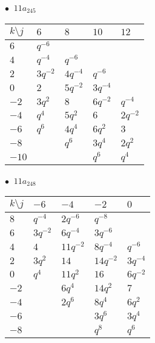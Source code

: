 \begin{minipage}{\linewidth}
$\bullet\ $ $11a_{245}$ \vspace{0.5em} \\
\begin{tabular}{l|llll}
$k \setminus j$ & $6$ & $8$ & $10$ & $12$ \\
\hline
$6$ & $q^{-6}$ &  &  &  \\
$4$ & $q^{-4}$ & $q^{-6}$ &  &  \\
$2$ & $3q^{-2}$ & $4q^{-4}$ & $q^{-6}$ &  \\
$0$ & $2$ & $5q^{-2}$ & $3q^{-4}$ &  \\
$-2$ & $3q^{2}$ & $8$ & $6q^{-2}$ & $q^{-4}$ \\
$-4$ & $q^{4}$ & $5q^{2}$ & $6$ & $2q^{-2}$ \\
$-6$ & $q^{6}$ & $4q^{4}$ & $6q^{2}$ & $3$ \\
$-8$ &  & $q^{6}$ & $3q^{4}$ & $2q^{2}$ \\
$-10$ &  &  & $q^{6}$ & $q^{4}$ \\
\end{tabular}
\vspace{2em}
\end{minipage}
%
\begin{minipage}{\linewidth}
$\bullet\ $ $11a_{248}$ \vspace{0.5em} \\
\begin{tabular}{l|llll}
$k \setminus j$ & $-6$ & $-4$ & $-2$ & $0$ \\
\hline
$8$ & $q^{-4}$ & $2q^{-6}$ & $q^{-8}$ &  \\
$6$ & $3q^{-2}$ & $6q^{-4}$ & $3q^{-6}$ &  \\
$4$ & $4$ & $11q^{-2}$ & $8q^{-4}$ & $q^{-6}$ \\
$2$ & $3q^{2}$ & $14$ & $14q^{-2}$ & $3q^{-4}$ \\
$0$ & $q^{4}$ & $11q^{2}$ & $16$ & $6q^{-2}$ \\
$-2$ &  & $6q^{4}$ & $14q^{2}$ & $7$ \\
$-4$ &  & $2q^{6}$ & $8q^{4}$ & $6q^{2}$ \\
$-6$ &  &  & $3q^{6}$ & $3q^{4}$ \\
$-8$ &  &  & $q^{8}$ & $q^{6}$ \\
\end{tabular}
\vspace{2em}
\end{minipage}
%
